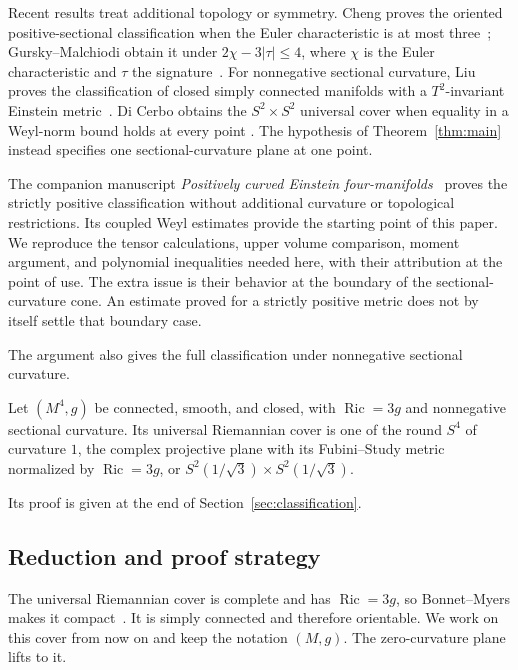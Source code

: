 Recent results treat additional topology or symmetry. Cheng proves the
oriented positive-sectional classification when the Euler characteristic
is at most three~\cite[Theorem~1.2]{Cheng2026}; Gursky--Malchiodi obtain
it under $2\chi-3|\tau|\le4$, where $\chi$ is the Euler characteristic
and $\tau$ the signature~\cite[Theorem~1.1]{GurskyMalchiodi2026}.
For nonnegative sectional curvature, Liu proves the classification of
closed simply connected manifolds with a $T^2$-invariant Einstein metric~\cite[Theorem~1.1]{Liu2025}.
Di Cerbo obtains the $S^2\times S^2$ universal cover when equality in a
Weyl-norm bound holds at every point
\cite[Proposition~3.2]{DiCerbo2026}. The hypothesis of
Theorem~\ref{thm:main} instead specifies one sectional-curvature plane
at one point.

The companion manuscript \emph{Positively curved Einstein
four-manifolds}~\cite{OpenAI2026P} proves the strictly positive
classification without additional curvature or topological restrictions.
Its coupled Weyl estimates provide the starting point of this paper.
We reproduce the tensor calculations, upper volume comparison, moment
argument, and polynomial inequalities needed here, with their
attribution at the point of use. The extra issue is their behavior at
the boundary of the sectional-curvature cone. An estimate proved for a
strictly positive metric does not by itself settle that boundary case.

The argument also gives the full classification under nonnegative
sectional curvature.

\begin{corollary}\label{cor:nonnegative-classification}
Let $(M^4,g)$ be connected, smooth, and closed, with
$\operatorname{Ric}=3g$ and nonnegative sectional curvature. Its universal
Riemannian cover is one of the round $S^4$ of curvature $1$, the complex
projective plane with its Fubini--Study metric normalized by
$\operatorname{Ric}=3g$, or $S^2(1/\sqrt3)\times S^2(1/\sqrt3)$.
\end{corollary}
Its proof is given at the end of Section~\ref{sec:classification}.

\subsection{Reduction and proof strategy}

The universal Riemannian cover is complete and has $\operatorname{Ric}=3g$,
so Bonnet--Myers makes it compact~\cite{Myers1941}. It is simply connected
and therefore orientable. We work on this cover from now on and keep the
notation $(M,g)$. The zero-curvature plane lifts to it.

